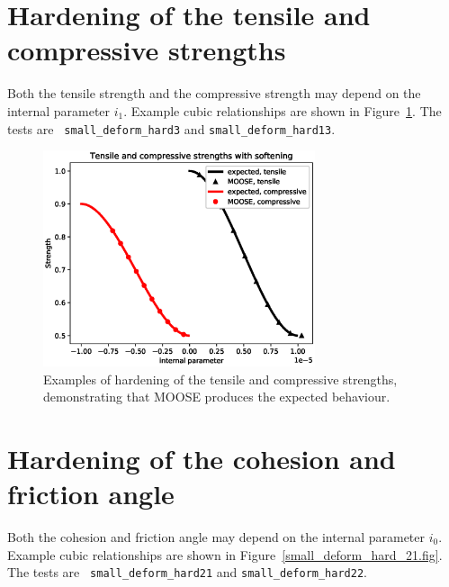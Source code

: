\documentclass[]{scrreprt}
\begin{document}
\section{Hardening of the tensile and compressive strengths}

Both the tensile strength and the compressive strength may depend on
the internal parameter $i_{1}$.  Example cubic relationships are shown
in Figure~\ref{small_deform_hard_3_13.fig}.  The tests are {\tt
  small\_deform\_hard3} and {\tt small\_deform\_hard13}.

\begin{figure}[htb]
  \begin{center}
\includegraphics[width=8cm]{small_deform_hard_3_13.eps}
\caption{Examples of hardening of the tensile and compressive
  strengths, demonstrating that MOOSE produces the expected behaviour.}
\label{small_deform_hard_3_13.fig}
\end{center}
\end{figure}


\section{Hardening of the cohesion and friction angle}

Both the cohesion and friction angle may depend on
the internal parameter $i_{0}$.  Example cubic relationships are shown
in Figure~\ref{small_deform_hard_21.fig}.  The tests are {\tt
  small\_deform\_hard21} and {\tt small\_deform\_hard22}.
\end{document}
